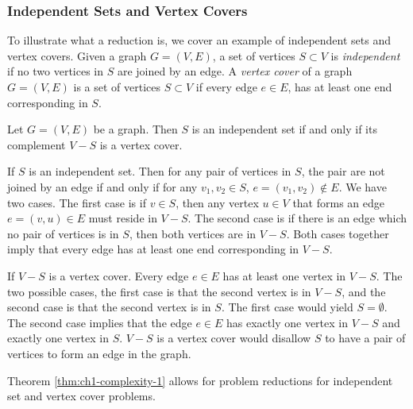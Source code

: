 \subsubsection{Independent Sets and Vertex Covers}
To illustrate what a reduction is, we cover an example of independent sets and vertex covers.  
Given a graph $G = (V,E)$, a set of vertices $S \subset V$ is \textit{independent} if no two vertices in $S$ are joined by an edge. 
A \textit{vertex cover} of a graph $G = (V,E)$  is a set of vertices $S \subset V$ if every edge $e \in E$, has at least one end corresponding in $S$.

\begin{thm}\label{thm:ch1-complexity-1}
Let $G = (V,E)$ be a graph.  
Then $S$ is an independent set if and only if its complement $V-S$ is a vertex cover.
\end{thm}
\begin{pf}
If $S$ is an independent set. Then for any pair of vertices in $S$, the pair are not joined by an edge if and only if for any $v_1, v_2 \in S$, $e = \left( v_1, v_2 \right) \not \in E$.  
We have two cases.  
The first case is if $v \in S$, then any vertex $u \in V$ that forms an edge $e = (v,u) \in E$ must reside in $V-S$. 
The second case is if there is an edge which no pair of vertices is in $S$, then both vertices are in $V-S$.  
Both cases together imply that every edge has at least one end corresponding in $V-S$. 

If $V-S$ is a vertex cover.  
Every edge $e \in E$ has at least one vertex in $V-S$.  
The two possible cases, the first case is that the second vertex is in $V-S$, and the second case is that the second vertex is in $S$.  The first case would yield $S = \emptyset$.  
The second case implies that the edge $e \in E$ has exactly one vertex in $V-S$ and exactly one vertex in $S$.  
$V-S$ is a vertex cover would disallow $S$ to have a pair of vertices to form an edge in the graph.
\end{pf}
Theorem \ref{thm:ch1-complexity-1} allows for problem reductions for independent set and vertex cover problems.

